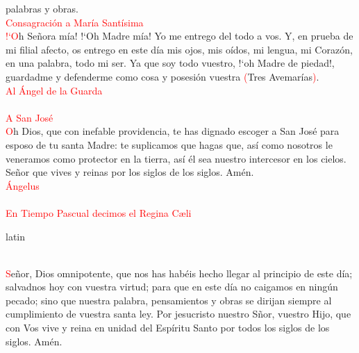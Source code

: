 \documentclass[9pt]{article}
\begin{document}
\begin{multicols}{2}
      palabras y obras.\\[1mm]
      \textcolor{red}{Consagración a María Santísima}\\
      \textcolor{red}{{!`}O}h Señora mía! {!`}Oh Madre mía! Yo me entrego del todo a vos. Y, en prueba de mi filial afecto, os entrego en este día mis ojos, mis oídos, mi lengua, mi Corazón,
      en una palabra, todo mi ser. Ya que soy todo vuestro, {!`}oh Madre de piedad!, guardadme y defenderme como cosa y posesión vuestra \textcolor{red}{(}Tres Avemarías\textcolor{red}{)}.\\[1mm]
      \textcolor{red}{Al Ángel de la Guarda}\\[-6.5mm]
      \\[1mm]
      \textcolor{red}{A San José}\\
      \textcolor{red}{O}h Dios, que con inefable providencia, te has dignado escoger a San José  para esposo de tu santa Madre: te suplicamos que hagas que, así como nosotros le veneramos
      como protector en la tierra, así él sea nuestro intercesor en los cielos. Señor que vives y reinas por los siglos de los siglos. Amén.\\[1mm]
      \textcolor{red}{Ángelus}\\
      \\[2mm]
      \textcolor{red}{En Tiempo Pascual decimos el Regina C{\ae}li}\\
      \begin{otherlanguage*}{latin}
            \\[0.5mm]
            \\[2mm]
      \end{otherlanguage*}
      \textcolor{red}{S}eñor, Dios omnipotente, que nos has habéis hecho llegar al principio de este día; salvadnos hoy con vuestra virtud; para que en este día no caigamos en ningún pecado;
      sino que nuestra palabra, pensamientos y obras se dirijan siempre al cumplimiento de vuestra santa ley. Por jesucristo nuestro Sñor, vuestro Hijo, que con Vos vive y reina en unidad
      del Espíritu Santo por todos los siglos de los siglos. Amén.\\[2mm]
      
\end{multicols}
\end{document}
